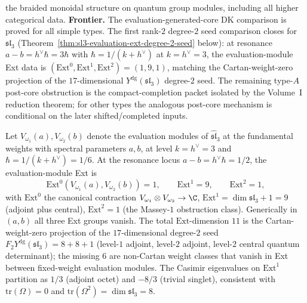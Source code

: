 \begin{definition}[DK levels]
\begin{enumerate}[label=\textup{DK-\arabic*.}]
 the braided monoidal structure on quantum group modules,
 including all higher categorical data.
 \textbf{Frontier.} The evaluation-generated-core DK comparison is
 proved for all simple types. The first rank-$2$ degree-$2$ seed
 comparison closes for $\mathfrak{sl}_3$
 \textup{(}Theorem~\ref{thm:sl3-evaluation-ext-degree-2-seed}
 below\textup{)}: at resonance
 $a - b = h^\vee \hbar = 3\hbar$ with $\hbar = 1/(k + h^\vee)$ at
 $k = h^\vee = 3$, the evaluation-module Ext data is
 $(\mathrm{Ext}^0, \mathrm{Ext}^1, \mathrm{Ext}^2) = (1, 9, 1)$,
 matching the Cartan-weight-zero projection of the $17$-dimensional
 $Y^{\mathrm{dg}}(\mathfrak{sl}_3)$ degree-$2$ seed. The remaining
 type-$A$ post-core obstruction is the compact-completion packet
 isolated by the Volume~I reduction theorem; for other types the
 analogous post-core mechanism is conditional on the later
 shifted/completed inputs.
\end{enumerate}
\end{definition}

\begin{theorem}
\label{thm:sl3-evaluation-ext-degree-2-seed}
Let $V_{\omega_1}(a), V_{\omega_2}(b)$ denote the evaluation modules of
$\widehat{\mathfrak{sl}}_3$ at the fundamental weights with spectral
parameters $a, b$, at level $k = h^\vee = 3$ and
$\hbar = 1/(k + h^\vee) = 1/6$. At the resonance locus
$a - b = h^\vee \hbar = 1/2$, the evaluation-module Ext is
\[
 \mathrm{Ext}^0(V_{\omega_1}(a), V_{\omega_2}(b)) = 1,
\qquad
 \mathrm{Ext}^1 = 9,
\qquad
 \mathrm{Ext}^2 = 1,
\]
with $\mathrm{Ext}^0$ the canonical contraction
$V_{\omega_1} \otimes V_{\omega_2} \to \C$,
$\mathrm{Ext}^1 = \dim \mathfrak{sl}_3 + 1 = 9$ (adjoint plus central),
$\mathrm{Ext}^2 = 1$ (the Massey-$1$ obstruction class). Generically
in $(a, b)$ all three Ext groups vanish. The total
$\mathrm{Ext}$-dimension $11$ is the Cartan-weight-zero projection of
the $17$-dimensional degree-$2$ seed
$F_2 Y^{\mathrm{dg}}(\mathfrak{sl}_3) = 8 + 8 + 1$
(level-$1$ adjoint, level-$2$ adjoint, level-$2$ central quantum
determinant); the missing $6$ are non-Cartan weight classes that
vanish in Ext between fixed-weight evaluation modules. The Casimir
eigenvalues on $\mathrm{Ext}^1$ partition as
$1/3$ (adjoint octet) and $-8/3$ (trivial singlet), consistent with
$\mathrm{tr}(\Omega) = 0$ and $\mathrm{tr}(\Omega^2) = \dim \mathfrak{sl}_3 = 8$.
\end{theorem}

